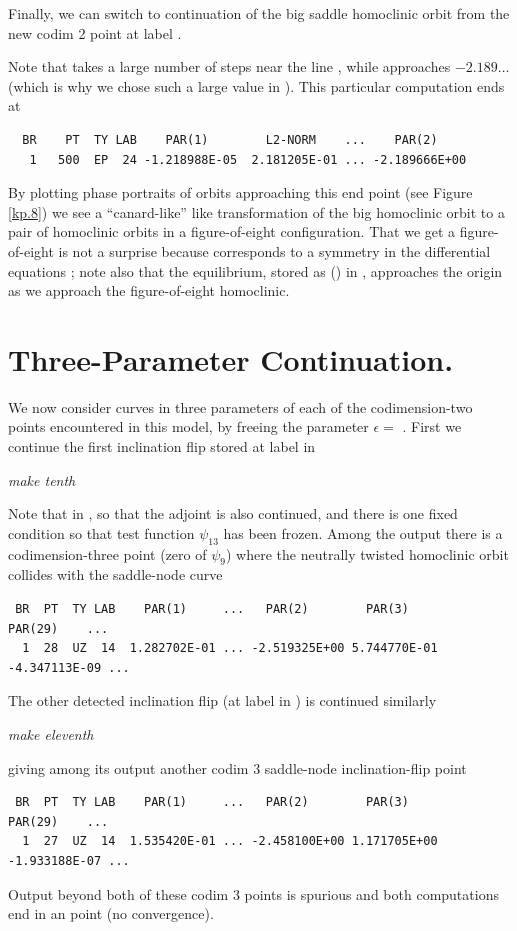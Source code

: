 \documentclass[12pt]{report}
\def\eps{\epsilon}
\begin{document}
Finally, we can switch to continuation of the big saddle homoclinic orbit 
from the new codim 2 point at label . 
\begin{center}
\end{center}
Note that \AUTO takes a large number of steps near the line  
, while  approaches $-2.189\ldots$  
(which is why we chose such a large value  in ). This
particular computation ends at 
\begin{verbatim}  
  BR    PT  TY LAB    PAR(1)        L2-NORM    ...    PAR(2)   
   1   500  EP  24 -1.218988E-05  2.181205E-01 ... -2.189666E+00
\end{verbatim}
By plotting phase portraits of orbits approaching this end point (see Figure
\ref{kp.8}) we see a ``canard-like'' like transformation of the big homoclinic
orbit to a pair of homoclinic orbits in a figure-of-eight configuration.
That we get a figure-of-eight is not a surprise because 
corresponds to a symmetry in the differential equations \cite{Ko:94};
note also that the equilibrium, stored as () in
, approaches the origin as we approach the figure-of-eight homoclinic.

\section{Three-Parameter Continuation.}
We now consider curves in three parameters of each of
the codimension-two points encountered in this model, by
freeing the parameter $\eps=$ .
First we continue the first inclination flip stored at label
 in 
\begin{center}
\it make tenth
\end{center}
Note that  in , so that the adjoint is also
continued, and there is one fixed condition  so that
test function $\psi_{13}$ has been frozen.
Among the output there is a codimension-three point (zero of $\psi_9$)
where the neutrally twisted homoclinic orbit collides with the saddle-node
curve
\begin{verbatim}
 BR  PT  TY LAB    PAR(1)     ...   PAR(2)        PAR(3)        PAR(29)    ...     
  1  28  UZ  14  1.282702E-01 ... -2.519325E+00 5.744770E-01 -4.347113E-09 ...
\end{verbatim}
The other detected inclination flip (at label  in ) is continued
similarly
\begin{center}
\it make eleventh
\end{center}
giving among its output another codim 3 saddle-node inclination-flip point
\begin{verbatim} 
 BR  PT  TY LAB    PAR(1)     ...   PAR(2)        PAR(3)        PAR(29)    ...  
  1  27  UZ  14  1.535420E-01 ... -2.458100E+00 1.171705E+00 -1.933188E-07 ... 
\end{verbatim}
Output beyond both of these codim 3 points is spurious and both computations end in
an  point (no convergence).
\end{document}
